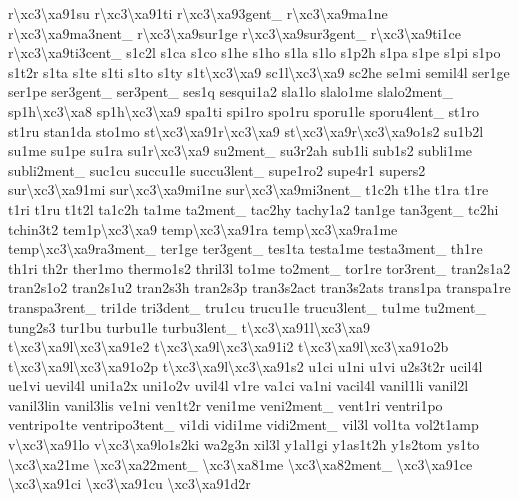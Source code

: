 \begin{DoxyCompactItemize}
r\textbackslash{}xc3\textbackslash{}xa91su r\textbackslash{}xc3\textbackslash{}xa91ti r\textbackslash{}xc3\textbackslash{}xa93gent\-\_\- r\textbackslash{}xc3\textbackslash{}xa9ma1ne r\textbackslash{}xc3\textbackslash{}xa9ma3nent\-\_\- r\textbackslash{}xc3\textbackslash{}xa9sur1ge r\textbackslash{}xc3\textbackslash{}xa9sur3gent\-\_\- r\textbackslash{}xc3\textbackslash{}xa9ti1ce r\textbackslash{}xc3\textbackslash{}xa9ti3cent\-\_\- s1c2l s1ca s1co s1he s1ho s1la s1lo s1p2h s1pa s1pe s1pi s1po s1t2r s1ta s1te s1ti s1to s1ty s1t\textbackslash{}xc3\textbackslash{}xa9 sc1l\textbackslash{}xc3\textbackslash{}xa9 sc2he se1mi semil4l ser1ge ser1pe ser3gent\-\_\- ser3pent\-\_\- ses1q sesqui1a2 sla1lo slalo1me slalo2ment\-\_\- sp1h\textbackslash{}xc3\textbackslash{}xa8 sp1h\textbackslash{}xc3\textbackslash{}xa9 spa1ti spi1ro spo1ru sporu1le sporu4lent\-\_\- st1ro st1ru stan1da sto1mo st\textbackslash{}xc3\textbackslash{}xa91r\textbackslash{}xc3\textbackslash{}xa9 st\textbackslash{}xc3\textbackslash{}xa9r\textbackslash{}xc3\textbackslash{}xa9o1s2 su1b2l su1me su1pe su1ra su1r\textbackslash{}xc3\textbackslash{}xa9 su2ment\-\_\- su3r2ah sub1li sub1s2 subli1me subli2ment\-\_\- suc1cu succu1le succu3lent\-\_\- supe1ro2 supe4r1 supers2 sur\textbackslash{}xc3\textbackslash{}xa91mi sur\textbackslash{}xc3\textbackslash{}xa9mi1ne sur\textbackslash{}xc3\textbackslash{}xa9mi3nent\-\_\- t1c2h t1he t1ra t1re t1ri t1ru t1t2l ta1c2h ta1me ta2ment\-\_\- tac2hy tachy1a2 tan1ge tan3gent\-\_\- tc2hi tchin3t2 tem1p\textbackslash{}xc3\textbackslash{}xa9 temp\textbackslash{}xc3\textbackslash{}xa91ra temp\textbackslash{}xc3\textbackslash{}xa9ra1me temp\textbackslash{}xc3\textbackslash{}xa9ra3ment\-\_\- ter1ge ter3gent\-\_\- tes1ta testa1me testa3ment\-\_\- th1re th1ri th2r ther1mo thermo1s2 thril3l to1me to2ment\-\_\- tor1re tor3rent\-\_\- tran2s1a2 tran2s1o2 tran2s1u2 tran2s3h tran2s3p tran3s2act tran3s2ats trans1pa transpa1re transpa3rent\-\_\- tri1de tri3dent\-\_\- tru1cu trucu1le trucu3lent\-\_\- tu1me tu2ment\-\_\- tung2s3 tur1bu turbu1le turbu3lent\-\_\- t\textbackslash{}xc3\textbackslash{}xa91l\textbackslash{}xc3\textbackslash{}xa9 t\textbackslash{}xc3\textbackslash{}xa9l\textbackslash{}xc3\textbackslash{}xa91e2 t\textbackslash{}xc3\textbackslash{}xa9l\textbackslash{}xc3\textbackslash{}xa91i2 t\textbackslash{}xc3\textbackslash{}xa9l\textbackslash{}xc3\textbackslash{}xa91o2b t\textbackslash{}xc3\textbackslash{}xa9l\textbackslash{}xc3\textbackslash{}xa91o2p t\textbackslash{}xc3\textbackslash{}xa9l\textbackslash{}xc3\textbackslash{}xa91s2 u1ci u1ni u1vi u2s3t2r ucil4l ue1vi uevil4l uni1a2x uni1o2v uvil4l v1re va1ci va1ni vacil4l vanil1li vanil2l vanil3lin vanil3lis ve1ni ven1t2r veni1me veni2ment\-\_\- vent1ri ventri1po ventripo1te ventripo3tent\-\_\- vi1di vidi1me vidi2ment\-\_\- vil3l vol1ta vol2t1amp v\textbackslash{}xc3\textbackslash{}xa91lo v\textbackslash{}xc3\textbackslash{}xa9lo1s2ki wa2g3n xil3l y1al1gi y1as1t2h y1s2tom ys1to \textbackslash{}xc3\textbackslash{}xa21me \textbackslash{}xc3\textbackslash{}xa22ment\-\_\- \textbackslash{}xc3\textbackslash{}xa81me \textbackslash{}xc3\textbackslash{}xa82ment\-\_\- \textbackslash{}xc3\textbackslash{}xa91ce \textbackslash{}xc3\textbackslash{}xa91ci \textbackslash{}xc3\textbackslash{}xa91cu \textbackslash{}xc3\textbackslash{}xa91d2r 
\end{DoxyCompactItemize}
